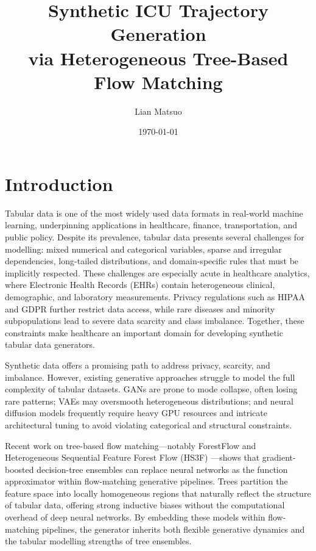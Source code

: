 \documentclass[11pt]{informatics-report}
\title{Synthetic ICU Trajectory Generation\\\vspace{0.2cm}via Heterogeneous Tree-Based Flow Matching}
\author{Lian Matsuo}
\date{\today}
\begin{document}
\setlength{\emergencystretch}{3em}
\createFrontMatter
\onehalfspacing
\tableofcontents
\doublespacing


\chapter{Introduction}

Tabular data is one of the most widely used data formats in real-world machine learning, underpinning applications in healthcare, finance, transportation, and public policy. Despite its prevalence, tabular data presents several challenges for modelling: mixed numerical and categorical variables, sparse and irregular dependencies, long-tailed distributions, and domain-specific rules that must be implicitly respected. These challenges are especially acute in healthcare analytics, where Electronic Health Records (EHRs) contain heterogeneous clinical, demographic, and laboratory measurements. Privacy regulations such as HIPAA and GDPR further restrict data access, while rare diseases and minority subpopulations lead to severe data scarcity and class imbalance. Together, these constraints make healthcare an important domain for developing synthetic tabular data generators.

Synthetic data offers a promising path to address privacy, scarcity, and imbalance. However, existing generative approaches struggle to model the full complexity of tabular datasets. GANs are prone to mode collapse, often losing rare patterns; VAEs may oversmooth heterogeneous distributions; and neural diffusion models frequently require heavy GPU resources and intricate architectural tuning to avoid violating categorical and structural constraints.

Recent work on tree-based flow matching---notably ForestFlow \cite{jolicoeur2023forest} and Heterogeneous Sequential Feature Forest Flow (HS3F) \cite{akazan2024hs3f}---shows that gradient-boosted decision-tree ensembles can replace neural networks as the function approximator within flow-matching generative pipelines. Trees partition the feature space into locally homogeneous regions that naturally reflect the structure of tabular data, offering strong inductive biases without the computational overhead of deep neural networks. By embedding these models within flow-matching pipelines, the generator inherits both flexible generative dynamics and the tabular modelling strengths of tree ensembles.
\end{document}
